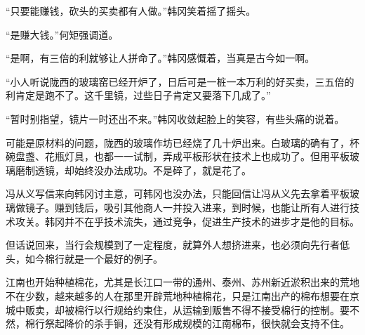 “只要能赚钱，砍头的买卖都有人做。”韩冈笑着摇了摇头。

“是赚大钱。”何矩强调道。

“是啊，有三倍的利就够让人拼命了。”韩冈感慨着，当真是古今如一啊。

“小人听说陇西的玻璃窑已经开炉了，日后可是一桩一本万利的好买卖，三五倍的利肯定是跑不了。这千里镜，过些日子肯定又要落下几成了。”

“暂时别指望，镜片一时还出不来。”韩冈收敛起脸上的笑容，有些头痛的说着。

可能是原材料的问题，陇西的玻璃作坊已经烧了几十炉出来。白玻璃的确有了，杯碗盘盏、花瓶灯具，也都一一试制，弄成平板形状在技术上也成功了。但用平板玻璃磨制透镜，却始终没办法成功。不是碎了，就是花了。

冯从义写信来向韩冈讨主意，可韩冈也没办法，只能回信让冯从义先去拿着平板玻璃做镜子。赚到钱后，吸引其他商人一并投入进来，到时候，也能让所有人进行技术攻关。韩冈并不在乎技术流失，通过竞争，促进生产技术的进步才是他的目标。

但话说回来，当行会规模到了一定程度，就算外人想挤进来，也必须向先行者低头，如今棉行就是一个最好的例子。

江南也开始种植棉花，尤其是长江口一带的通州、泰州、苏州新近淤积出来的荒地不在少数，越来越多的人在那里开辟荒地种植棉花，只是江南出产的棉布想要在京城中贩卖，却被棉行以行规给约束住，从运输到贩售不得不接受棉行的控制。要不然，棉行祭起降价的杀手锏，还没有形成规模的江南棉布，很快就会支持不住。

